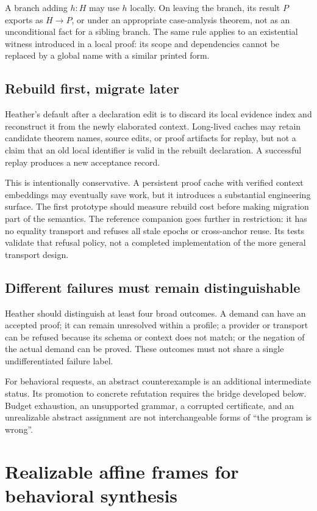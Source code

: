\documentclass[11pt,letterpaper]{article}
\theoremstyle{definition}\newtheorem{definition}[theorem]{Definition}
\theoremstyle{remark}\newtheorem{remark}[theorem]{Remark}
\begin{document}
A branch adding $h:H$ may use $h$ locally. On leaving the branch, its result
$P$ exports as $H\to P$, or under an appropriate case-analysis theorem, not as
an unconditional fact for a sibling branch. The same rule applies to an
existential witness introduced in a local proof: its scope and dependencies
cannot be replaced by a global name with a similar printed form.

\subsection{Rebuild first, migrate later}
Heather's default after a declaration edit is to discard its local evidence
index and reconstruct it from the newly elaborated context. Long-lived caches
may retain candidate theorem names, source edits, or proof artifacts for replay,
but not a claim that an old local identifier is valid in the rebuilt declaration.
A successful replay produces a new acceptance record.

This is intentionally conservative. A persistent proof cache with verified
context embeddings may eventually save work, but it introduces a substantial
engineering surface. The first prototype should measure rebuild cost before
making migration part of the semantics. The reference companion goes further
in restriction: it has no equality transport and refuses all stale epochs or
cross-anchor reuse. Its tests validate that refusal policy, not a completed
implementation of the more general transport design.

\subsection{Different failures must remain distinguishable}
Heather should distinguish at least four broad outcomes. A demand can have an
accepted proof; it can remain unresolved within a profile; a provider or
transport can be refused because its schema or context does not match; or the
negation of the actual demand can be proved. These outcomes must not share a
single undifferentiated failure label.

For behavioral requests, an abstract counterexample is an additional intermediate
status. Its promotion to concrete refutation requires the bridge developed
below. Budget exhaustion, an unsupported grammar, a corrupted certificate,
and an unrealizable abstract assignment are not interchangeable forms of
``the program is wrong''.

\section{Realizable affine frames for behavioral synthesis}\label{sec:frames}
\end{document}
